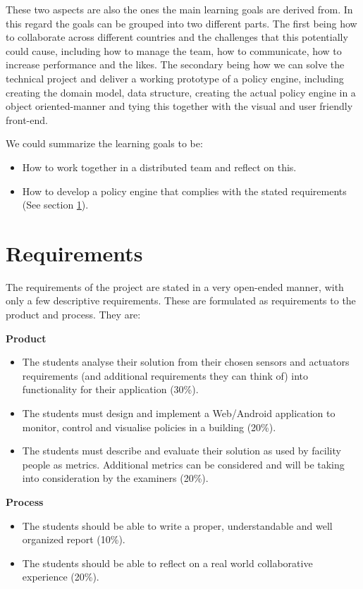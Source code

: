 These two aspects are also the ones the main learning goals are derived from. In this regard the goals can be grouped into two different parts. The first being how to collaborate across different countries and the challenges that this potentially could cause, including how to manage the team, how to communicate, how to increase performance and the likes. The secondary being how we can solve the technical project and deliver a working prototype of a policy engine, including creating the domain model, data structure, creating the actual policy engine in a object oriented-manner and tying this together with the visual and user friendly front-end.

We could summarize the learning goals to be: 
\begin{itemize}
\item How to work together in a distributed team and reflect on this.
\item How to develop a policy engine that complies with the stated requirements (See section \ref{sec:requirements}).
\end{itemize}

\section{Requirements} \label{sec:requirements}
The requirements of the project are stated in a very open-ended manner, with only a few descriptive requirements. These are formulated as requirements to the product and process. They are:

\textbf{Product}
\begin{itemize}
	\item The students analyse their solution from their chosen sensors and actuators requirements (and additional requirements they can think of) into functionality for their application (30\%).
	\item The students must design and implement a Web/Android application to monitor, control and visualise policies in a building (20\%).
	\item The students must describe and evaluate their solution as used by facility people as metrics. Additional metrics can be considered and will be taking into consideration by the examiners (20\%).
\end{itemize}

\textbf{Process}
\begin{itemize}
	\item The students should be able to write a proper, understandable and well organized report (10\%).
	\item The students should be able to reflect on a real world collaborative experience (20\%).
\end{itemize}